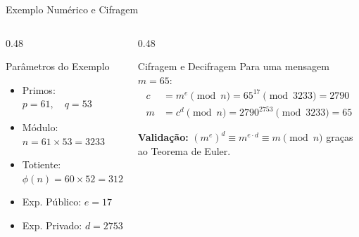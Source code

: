 \documentclass[aspectratio=169, 10pt]{beamer}
\begin{document}
\begin{frame}{Exemplo Numérico e Cifragem}
    \begin{columns}[T]
        \begin{column}{0.48\textwidth}
            \begin{block}{Parâmetros do Exemplo}
                \begin{itemize}
                    \item Primos: $p = 61, \quad q = 53$
                    \item Módulo: $n = 61 \times 53 = 3233$
                    \item Totiente: $\phi(n) = 60 \times 52 = 3120$
                    \item Exp. Público: $e = 17$
                    \item Exp. Privado: $d = 2753$
                \end{itemize}
            \end{block}
        \end{column}
        \begin{column}{0.48\textwidth}
            \begin{block}{Cifragem e Decifragem}
                Para uma mensagem $m = 65$:
                \begin{align*}
                    c &= m^e \pmod n = 65^{17} \pmod{3233} = 2790 \\[4pt]
                    m &= c^d \pmod n = 2790^{2753} \pmod{3233} = 65
                \end{align*}
            \end{block}
            \small
            \textbf{Validação:} $(m^e)^d \equiv m^{e \cdot d} \equiv m \pmod n$ graças ao Teorema de Euler.
        \end{column}
    \end{columns}
\end{frame}
\end{document}
